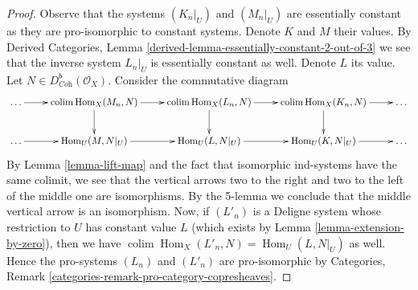 \documentclass[10pt,a4paper]{amsart}
\theoremstyle{plain}
\theoremstyle{definition}
\theoremstyle{remark}
\numberwithin{equation}{subsection}
\def\colim{\mathop{\mathrm{colim}}\nolimits}
\def\Hom{\mathop{\mathrm{Hom}}\nolimits}
\begin{document}
\begin{proof}
Observe that the systems $(K_n|_U)$ and $(M_n|_U)$ are essentially constant
as they are pro-isomorphic to constant systems.
Denote $K$ and $M$ their values. By Derived Categories, Lemma
\ref{derived-lemma-essentially-constant-2-out-of-3}
we see that the inverse system $L_n|_U$ is essentially constant as well.
Denote $L$ its value.
Let $N \in D^b_{\textit{Coh}}(\mathcal{O}_X)$. Consider the commutative
diagram
$$
\xymatrix{
\ldots \ar[r] &
\colim \Hom_X(M_n, N) \ar[r] \ar[d] &
\colim \Hom_X(L_n, N) \ar[r] \ar[d] &
\colim \Hom_X(K_n, N) \ar[r] \ar[d] &
\ldots \\
\ldots \ar[r] &
\Hom_U(M, N|_U) \ar[r] &
\Hom_U(L, N|_U) \ar[r] &
\Hom_U(K, N|_U) \ar[r] &
\ldots
}
$$
By Lemma \ref{lemma-lift-map} and the fact that isomorphic ind-systems
have the same colimit, we see that the vertical arrows two to the right
and two to the left of the middle one are isomorphisms. By the 5-lemma
we conclude that the
middle vertical arrow is an isomorphism. Now, if $(L'_n)$ is a Deligne system
whose restriction to $U$ has constant value $L$ (which
exists by Lemma \ref{lemma-extension-by-zero}), then
we have $\colim \Hom_X(L'_n, N) = \Hom_U(L, N|_U)$ as well.
Hence the pro-systems $(L_n)$ and $(L'_n)$ are
pro-isomorphic by
Categories, Remark \ref{categories-remark-pro-category-copresheaves}.
\end{proof}
\end{document}
